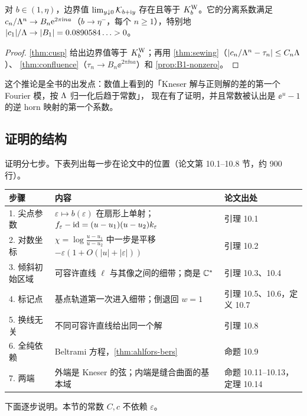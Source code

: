 \begin{corollary}\label{ch10:cor:separation}
对 $b\in(1,\eta)$，边界值 $\lim_{y\downarrow0}\mathcal K_{b+\mathrm{i} y}$ 存在且等于 $K^{\mathrm W}_b$。它的分离系数满足
$c_n/\Lambda^n\to B_n\mathrm{e}^{2\pi\mathrm{i} na}$（$b\to\eta^-$，每个 $n\ge1$），特别地 $|c_1|/\Lambda\to|B_1|=0.0890584\ldots>0$。
\end{corollary}

\begin{proof}
\cref{thm:cusp} 给出边界值等于 $K^{\mathrm W}_b$；再用 \cref{thm:sewing}（$|c_n/\Lambda^n-\tau_n|\le C_n\Lambda$）、
\cref{thm:confluence}（$\tau_n\to B_n\ee^{2\pi\ii na}$）和 \cref{prop:B1-nonzero}。
\end{proof}

这个推论是全书的出发点：数值上看到的「Kneser 解与正则解的差的第一个 Fourier 模，按 $\Lambda$ 归一化后趋于常数」，
现在有了证明，并且常数被认出是 $\ee^u-1$ 的逆 horn 映射的第一个系数。

\subsection{证明的结构}

证明分七步。下表列出每一步在论文中的位置（论文第 10.1--10.8 节，约 900 行）。
\begin{center}\small
\begin{tabular}{p{2.3cm}p{8.6cm}p{3.2cm}}
\toprule
步骤 & 内容 & 论文出处\\
\midrule
1. 尖点参数 & $\varepsilon\mapsto b(\varepsilon)$ 在扇形上单射；$f_\varepsilon-\mathrm{id}=(u-u_1)(u-u_2)k_\varepsilon$ & 引理 10.1\\
2. 对数坐标 & $\chi=\log\frac{u-u_1}{u-u_2}$ 中一步是平移 $-\varepsilon(1+O(|u|+|\varepsilon|))$ & 引理 10.2\\
3. 倾斜初始区域 & 可容许直线 $\ell$ 与其像之间的细带；商是 $\mathbb{C}^*$ & 引理 10.3、10.4\\
4. 标记点 & 基点轨道第一次进入细带；倒退回 $w=1$ & 引理 10.5、10.6，定义 10.7\\
5. 换线无关 & 不同可容许直线给出同一个解 & 引理 10.8\\
6. 全纯依赖 & Beltrami 方程，\cref{thm:ahlfors-bers} & 命题 10.9\\
7. 两端 & 外端是 Kneser 的弦；内端是缝合曲面的基本域 & 命题 10.11--10.13，定理 10.14\\
\bottomrule
\end{tabular}
\end{center}

下面逐步说明。本节的常数 $C,c$ 不依赖 $\varepsilon$。

